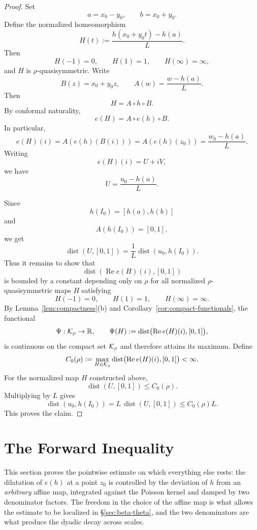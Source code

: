 \begin{proof}
	Set
	\[
	a=x_0-y_0,\qquad b=x_0+y_0.
	\]
	Define the normalized homeomorphism
	\[
	H(t):=\frac{h(x_0+y_0t)-h(a)}{L}.
	\]
	Then
	\[
	H(-1)=0,\qquad H(1)=1,\qquad H(\infty)=\infty,
	\]
	and $H$ is $\rho$-quasisymmetric. Write
	\[
	B(z)=x_0+y_0z,\qquad
	A(w)=\frac{w-h(a)}{L}.
	\]
	Then
	\[
	H=A\circ h\circ B.
	\]
	By conformal naturality,
	\[
	e(H)=A\circ e(h)\circ B.
	\]
	In particular,
	\[
	e(H)(i)
	=
	A(e(h)(B(i)))
	=
	A(e(h)(z_0))
	=
	\frac{w_0-h(a)}{L}.
	\]
	Writing
	\[
	e(H)(i)=U+iV,
	\]
	we have
	\[
	U=\frac{u_0-h(a)}{L}.
	\]
	
	Since
	\[
	h(I_0)=[h(a),h(b)]
	\]
	and
	\[
	A(h(I_0))=[0,1],
	\]
	we get
	\[
	\operatorname{dist}(U,[0,1])
	=
	\frac{1}{L}\operatorname{dist}(u_0,h(I_0)).
	\]
	Thus it remains to show that
	\[
	\operatorname{dist}(\operatorname{Re}e(H)(i),[0,1])
	\]
	is bounded by a constant depending only on $\rho$ for all normalized
	$\rho$-quasisymmetric maps $H$ satisfying
	\[
	H(-1)=0,\qquad H(1)=1,\qquad H(\infty)=\infty.
	\]
	By Lemma~\ref{lem:compactness}(b) and Corollary~\ref{cor:compact-functionals},
	the functional
	\[
	\Psi:\mathcal{K}_\rho\to\mathbb{R},\qquad
	\Psi(H):=\operatorname{dist}\bigl(\operatorname{Re}e(H)(i),[0,1]\bigr),
	\]
	is continuous on the compact set $\mathcal{K}_\rho$ and therefore attains its
	maximum. Define
	\[
	C_0(\rho):=\max_{H\in\mathcal{K}_\rho}
	\operatorname{dist}\bigl(\operatorname{Re}e(H)(i),[0,1]\bigr)<\infty .
	\]
	For the normalized map $H$ constructed above,
	\[
	\operatorname{dist}(U,[0,1])\le C_0(\rho).
	\]
	Multiplying by $L$ gives
	\[
	\operatorname{dist}(u_0,h(I_0))
	=
	L\,\operatorname{dist}(U,[0,1])
	\le
	C_0(\rho)L.
	\]
	This proves the claim.
\end{proof}

\section{The Forward Inequality}\label{sec:forward}

This section proves the pointwise estimate on which everything else rests: the
dilatation of $e(h)$ at a point $z_0$ is controlled by the deviation of $h$
from an \emph{arbitrary} affine map, integrated against the Poisson kernel and
damped by two denominator factors. The freedom in the choice of the affine map
is what allows the estimate to be localized in \S\ref{sec:beta-theta}, and the
two denominators are what produce the dyadic decay across scales.

